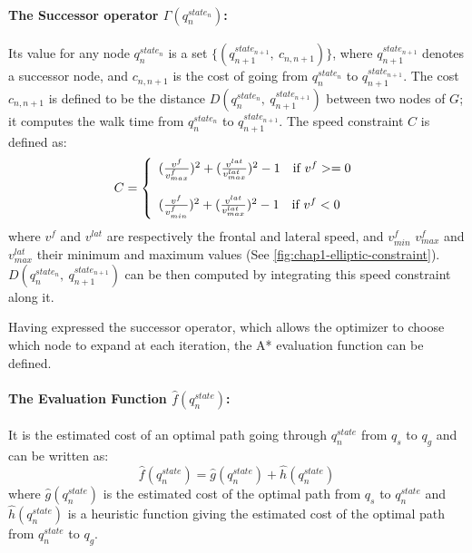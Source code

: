 \paragraph{The Successor operator $\Gamma(q_n^{state_n})$:}
Its value for any node $q_n^{state_n}$ is a set
$\{(q_{n+1}^{state_{n+1}},~c_{n,n+1})\}$, where
$q_{n+1}^{state_{n+1}}$ denotes a successor node, and $c_{n,n+1}$ is
the cost of going from $q_n^{state_n}$ to $q_{n+1}^{state_{n+1}}$. The
cost $c_{n,n+1}$ is defined to be the distance
$D(q_n^{state_n},~q_{n+1}^{state_{n+1}})$ between two nodes of $G$; it
computes the walk time from $q_n^{state_n}$ to
$q_{n+1}^{state_{n+1}}$. The speed constraint $C$ is defined as:
\begin{equation}
C = \left\{
\begin{array}{l l l}
  (\frac{v^{f}}{v_{max}^{f}})^2 +
  (\frac{v^{lat}}{v_{max}^{lat}})^2 - 1
  \quad \text{if } v^f >= 0 \\

  \\

  (\frac{v^{f}}{v_{min}^{f}})^2 +
  (\frac{v^{lat}}{v_{max}^{lat}})^2 - 1
  \quad \text{if } v^f < 0
\end{array} \right.
\end{equation}
where $v^{f}$ and $v^{lat}$ are respectively the frontal and lateral
speed, and $v_{min}^f$ $v_{max}^{f}$ and $v_{max}^{lat}$ their minimum
and maximum values (See
\autoref{fig:chap1-elliptic-constraint}). $D(q_n^{state_n},~q_{n+1}^{state_{n+1}})$
can be then computed by integrating this speed constraint along it.

Having expressed the successor operator, which allows the optimizer to
choose which node to expand at each iteration, the A* evaluation
function can be defined.

\paragraph{The Evaluation Function $\hat{f}(q_n^{state})$:}
It is the estimated cost of an optimal path going through
$q_n^{state}$ from $q_s$ to $q_g$ and can be written as:
\begin{equation}
  \hat{f}(q_n^{state}) = \hat{g}(q_n^{state}) + \hat{h}(q_n^{state})
\end{equation}
where $\hat{g}(q_n^{state})$ is the estimated cost of the optimal path
from $q_s$ to $q_n^{state}$ and $\hat{h}(q_n^{state})$ is a heuristic
function giving the estimated cost of the optimal path from
$q_n^{state}$ to $q_g$.

